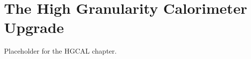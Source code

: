 \chapter{The High Granularity Calorimeter Upgrade}
\label{ch:hgcal}

Placeholder for the HGCAL chapter.
